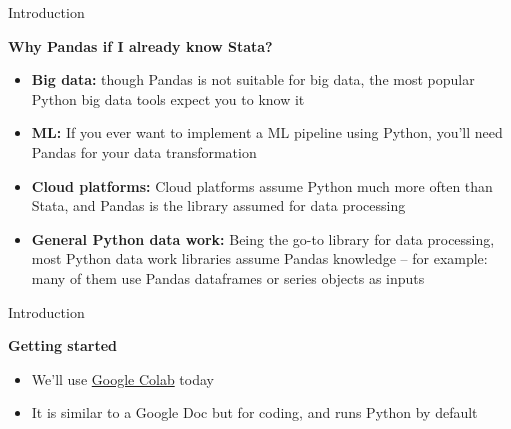 \documentclass[aspectratio=169]{beamer}
\begin{document}
\begin{frame}{Introduction}

	\textbf{Why Pandas if I already know Stata?}

	\begin{itemize}
		\item \textbf{Big data:} though Pandas is not suitable for big data,  the most popular Python big data tools expect you to know it
		\item \textbf{ML:} If you ever want to implement a ML pipeline using Python, you'll need Pandas for your data transformation
		\item \textbf{Cloud platforms:} Cloud platforms assume Python much more often than Stata, and Pandas is the library assumed for data processing
		\item \textbf{General Python data work:} Being the go-to library for data processing, most Python data work libraries assume Pandas knowledge -- for example: many of them use Pandas dataframes or series objects as inputs
	\end{itemize}

\end{frame}

\begin{frame}{Introduction}

	\textbf{Getting started}

	\begin{itemize}
		\item We'll use \href{http://colab.research.google.com}{Google Colab} today
		\item It is similar to a Google Doc but for coding, and runs Python by default
	\end{itemize}

\end{frame}
\end{document}
